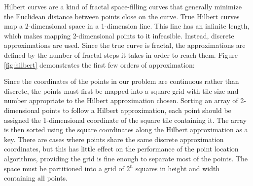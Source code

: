 Hilbert curves are a kind of fractal space-filling curves \cite{sfcurves} that generally minimize the Euclidean distance between points close on the curve. True Hilbert curves map a 2-dimensional space in a 1-dimension line. This line has an infinite length, which makes mapping 2-dimensional points to it infeasible. Instead, discrete approximations are used. Since the true curve is fractal, the approximations are defined by the number of fractal steps it takes in order to reach them. Figure \ref*{fig:hilbert} demonstrates the first few orders of approximation:

Since the coordinates of the points in our problem are continuous rather than discrete, the points must first be mapped into a square grid with tile size and number appropriate to the Hilbert approximation chosen.
Sorting an array of 2-dimensional points to follow a Hilbert approximation, each point should be assigned the 1-dimensional coordinate of the square tile containing it. The array is then sorted using the square coordinates along the Hilbert approximation as a key.
There are cases where points share the same discrete approximation coordinates, but this has little effect on the performance of the point location algorithms, providing the grid is fine enough to separate most of the points. The space must be partitioned into a grid of $2^n$ squares in height and width containing all points.

